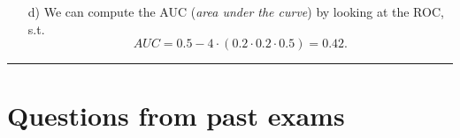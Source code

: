 \documentclass[a4paper]{article}
\makeatletter
\def\maxwidth{ %
  \ifdim\Gin@nat@width>\linewidth
    \linewidth
  \else
    \Gin@nat@width
  \fi
}
\newcommand{\hlnum}[1]{\textcolor[rgb]{0.686,0.059,0.569}{#1}}%
\newcommand{\hlstr}[1]{\textcolor[rgb]{0.192,0.494,0.8}{#1}}%
\newcommand{\hlopt}[1]{\textcolor[rgb]{0,0,0}{#1}}%
\newcommand{\hlstd}[1]{\textcolor[rgb]{0.345,0.345,0.345}{#1}}%
\newcommand{\hlkwc}[1]{\textcolor[rgb]{0.333,0.667,0.333}{#1}}%
\newcommand{\hlkwd}[1]{\textcolor[rgb]{0.737,0.353,0.396}{\textbf{#1}}}%
\newenvironment{kframe}{%
 \def\at@end@of@kframe{}%
 \ifinner\ifhmode%
  \def\at@end@of@kframe{\end{minipage}}%
  \begin{minipage}{\columnwidth}%
 \fi\fi%
 \def\FrameCommand##1{\hskip\@totalleftmargin \hskip-\fboxsep
 \colorbox{shadecolor}{##1}\hskip-\fboxsep
     \hskip-\linewidth \hskip-\@totalleftmargin \hskip\columnwidth}%
 \MakeFramed {\advance\hsize-\width
   \@totalleftmargin\z@ \linewidth\hsize
   \@setminipage}}%
 {\par\unskip\endMakeFramed%
 \at@end@of@kframe}
\newenvironment{knitrout}{}{} %
\newcommand{\exexams}
  {\color{black} \hrule \section{Questions from past exams}}
\makeatother
\begin{document}
{\begin{enumerate}
\begin{knitrout}
\begin{kframe}
\begin{alltt}
\hlkwd{ggplot}\hlstd{(roc_data,} \hlkwd{aes}\hlstd{(}\hlkwc{x} \hlstd{= FPR,} \hlkwc{y} \hlstd{= TPR))} \hlopt{+} \hlkwd{geom_line}\hlstd{()} \hlopt{+}
  \hlkwd{geom_abline}\hlstd{(}\hlkwc{slope} \hlstd{=} \hlnum{1}\hlstd{,} \hlkwc{intercept} \hlstd{=} \hlnum{0}\hlstd{,} \hlkwc{linetype} \hlstd{=} \hlstr{'dashed'}\hlstd{)}
\end{alltt}
\end{kframe}

{\centering \texttt{[image: figure/unnamed-chunk-25-1]} 

}


\end{knitrout}

We see that the resulting ROC lies below the line from the origin with a slope of 1, which represents
a random classifier, i.e., the scoring algorithm performs worse than a random classifier.
If this happens while evaluating the training data, the labels of the scoring algorithm should be inverted.

  \item[d)] 
  We can compute the AUC (\textit{area under the curve}) by looking at the ROC, s.t.
  $$
  AUC = 0.5 - 4 \cdot (0.2 \cdot 0.2 \cdot 0.5) = 0.42.
  $$

\end{enumerate}
}


\dlz
\exexams
\lz

\end{document}
